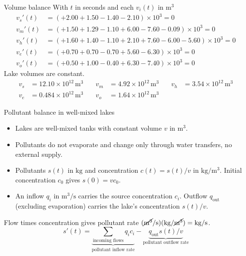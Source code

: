 \documentclass[11pt,aspectratio=169]{beamer}
\begin{document}
\begin{frame}{Volume balance}
\small
With $t$ in seconds and each $v_i(t)$ in $\mathrm{m^3}$
\[
\begin{aligned}
v_s'(t) &= (+2.00+1.50-1.40-2.10)\times10^3=0\\
v_m'(t) &= (+1.50+1.29-1.10+6.00-7.60-0.09)\times10^3=0\\
v_h'(t) &= (+1.60+1.40-1.10+2.10+7.60-6.00-5.60)\times10^3=0\\
v_e'(t) &= (+0.70+0.70-0.70+5.60-6.30)\times10^3=0\\
v_o'(t) &= (+0.50+1.00-0.40+6.30-7.40)\times10^3=0
\end{aligned}
\]
Lake volumes are constant.
\[
\begin{aligned}
v_s&=12.10\times10^{12}\,\mathrm{m^3}\quad
&v_m&=4.92\times10^{12}\,\mathrm{m^3}\quad
&v_h&=3.54\times10^{12}\,\mathrm{m^3}\\
v_e&=0.484\times10^{12}\,\mathrm{m^3}\quad
&v_o&=1.64\times10^{12}\,\mathrm{m^3}
\end{aligned}
\]
\end{frame}

\begin{frame}{Pollutant balance in well-mixed lakes}
\small
\begin{itemize}
\item Lakes are well-mixed tanks with constant volume $v$ in $\mathrm{m^3}$.
\item Pollutants do not evaporate and change only through water 
transfers, no external supply. 
\item Pollutants $s(t)$ in $\mathrm{kg}$ and concentration $c(t)=s(t)/v$ in $\mathrm{kg/m^3}$. Initial concentration $c_0$ gives $s(0)=vc_0$.
\item An inflow $q_i$ in $\mathrm{m^3/s}$ carries the source concentration $c_i$. Outflow $q_{\mathrm{out}}$ (excluding evaporation) carries the lake's concentration $s(t)/v$.
\end{itemize}

Flow times concentration gives pollutant rate
\(
(\cancel{\mathrm{m^3}}/\mathrm{s})(\mathrm{kg}/\cancel{\mathrm{m^3}})
=\mathrm{kg}/\mathrm{s}
\).
\[
s'(t)=\underbrace{\sum_{\text{incoming flows}}q_i c_i}_{\text{pollutant inflow rate}}
-\underbrace{q_{\mathrm{out}}s(t)/v}_{\text{pollutant outflow rate}}
\]
\end{frame}
\end{document}
